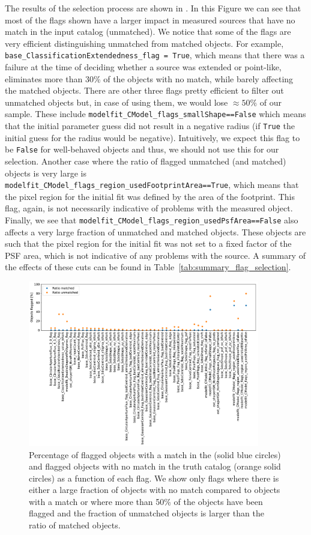 \documentclass[twocolumn]{aastex62}
\begin{document}
The results of the selection process are shown in . In this Figure we can see that most of the flags shown have a larger impact in measured sources that have no match in the input catalog (unmatched). We notice that some of the flags are very efficient distinguishing unmatched from matched objects. For example, \texttt{base\_ClassificationExtendedness\_flag = True}, which means that there was a failure at the time of deciding whether a source was extended or point-like, eliminates more than 30\% of the objects with no match, while barely affecting the matched objects. There are other three flags pretty efficient to filter out unmatched objects but, in case of using them, we would lose $\approx 50\%$ of our sample. These include \texttt{modelfit\_CModel\_flags\_smallShape==False} which means that the initial parameter guess did not result in a negative radius (if \texttt{True} the initial guess for the radius would be negative). Intuitively, we expect this flag to be \texttt{False} for well-behaved objects and thus, we should not use this for our selection. Another case where the ratio of flagged unmatched (and matched) objects is very large is \texttt{modelfit\_CModel\_flags\_region\_usedFootprintArea==True}, which means that the pixel region for the initial fit was defined by the area of the footprint. This flag, again, is not necessarily indicative of problems with the measured object. Finally, we see that \texttt{modelfit\_CModel\_flags\_region\_usedPsfArea==False} also affects a very large fraction of unmatched and matched objects. These objects are such that the pixel region for the initial fit was not set to a fixed factor of the PSF area, which is not indicative of any problems with the source. A summary of the effects of these cuts can be found in Table~\ref{tab:summary_flag_selection}.

\begin{figure}
\centering
\includegraphics[width=0.9\textwidth]{flags_DC1}
\caption{Percentage of flagged objects with a match in the (solid blue circles) and flagged objects with no match in the truth catalog (orange solid circles) as a function of each flag. We show only flags where there is either a large fraction of objects with no match compared to objects with a match or where more than 50\% of the objects have been flagged and the fraction of unmatched objects is larger than the ratio of matched objects.}
\label{fig:flags_DC1}
\end{figure}
\end{document}
